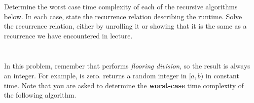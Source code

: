 \begin{prob}
    Determine the worst case time complexity of each of the recursive algorithms below.
    In each case, state the recurrence relation describing the runtime. Solve the recurrence
    relation, either by unrolling it or showing that it is the same as a recurrence we have
    encountered in lecture.

    \begin{subprobset}
        \begin{subprob}
            \inputminted{python}{\thisdir/include/part_a.py}

            \begin{soln}
                
            \end{soln}
        \end{subprob}


        \begin{subprob}

            \inputminted{python}{\thisdir/include/part_b.py}

            \begin{soln}
                
            \end{soln}
        \end{subprob}

        \begin{subprob}
            In this problem, remember that \python{//} performs \emph{flooring division},
            so the result is always an integer. For example,  is zero.
             returns a random integer in $[a,b)$ in constant time. Note that you are asked to determine the {\bf worst-case} time complexity of the following algorithm. 

            \inputminted{python}{\thisdir/include/part_c.py}

            \begin{soln}
                
            \end{soln}
        \end{subprob}

    \end{subprobset}

\end{prob}